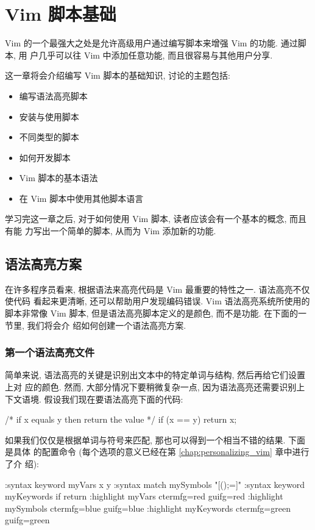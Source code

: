 \chapter{Vim 脚本基础}
\label{chap:basic_vim_scripting}

Vim 的一个最强大之处是允许高级用户通过编写脚本来增强 Vim 的功能. 通过脚本, 用
户几乎可以往 Vim 中添加任意功能, 而且很容易与其他用户分享.

这一章将会介绍编写 Vim 脚本的基础知识, 讨论的主题包括:
\begin{itemize}
    \item 编写语法高亮脚本
    \item 安装与使用脚本
    \item 不同类型的脚本
    \item 如何开发脚本
    \item Vim 脚本的基本语法
    \item 在 Vim 脚本中使用其他脚本语言
\end{itemize}

学习完这一章之后, 对于如何使用 Vim 脚本, 读者应该会有一个基本的概念, 而且有能
力写出一个简单的脚本, 从而为 Vim 添加新的功能.

\section{语法高亮方案}
\label{sec:syntax_color_schemes}

在许多程序员看来, 根据语法来高亮代码是 Vim 最重要的特性之一. 语法高亮不仅使代码
看起来更清晰, 还可以帮助用户发现编码错误. Vim 语法高亮系统所使用的脚本非常像
Vim 脚本, 但是语法高亮脚本定义的是颜色, 而不是功能. 在下面的一节里, 我们将会介
绍如何创建一个语法高亮方案.

\subsection{第一个语法高亮文件}
\label{subsec:your_first_syntax_color_file}

简单来说, 语法高亮的关键是识别出文本中的特定单词与结构, 然后再给它们设置上对
应的颜色. 然而, 大部分情况下要稍微复杂一点, 因为语法高亮还需要识别上下文语境.
假设我们现在要语法高亮下面的代码:
\begin{vimcode}
/* if x equals y then return the value */
if (x == y)
  {
    return x;
  }
\end{vimcode}

如果我们仅仅是根据单词与符号来匹配, 那也可以得到一个相当不错的结果. 下面是具体
的配置命令 (每个选项的意义已经在第 \ref{chap:personalizing_vim} 章中进行了介
绍):
\begin{vimcode}
:syntax keyword myVars x y
:syntax match mySymbols "[{}();=]"
:syntax keyword myKeywords if return
:highlight myVars ctermfg=red guifg=red
:highlight mySymbols ctermfg=blue guifg=blue
:highlight myKeywords ctermfg=green guifg=green
\end{vimcode}

